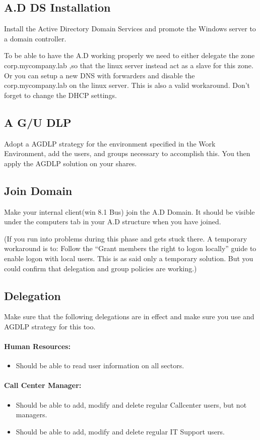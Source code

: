 \documentclass[paper=a4, fontsize=11pt]{report} %
\begin{document}
\subsection{A.D DS Installation}
Install the Active Directory Domain Services and promote the Windows server to a domain controller.

To be able to have the A.D working properly we need to either delegate the zone corp.mycompany.lab ,so that the linux server instead act as a slave for this zone. Or you can setup a new DNS with forwarders and disable the corp.mycompany.lab on the linux server. This is also a valid workaround. Don't forget to change the DHCP settings.

\subsection{A G/U DLP}
Adopt a AGDLP strategy for the environment specified in the Work Environment, add the users, and groups necessary to accomplish this. You then apply the AGDLP solution on your shares.

\subsection{Join Domain}
Make your internal client(win 8.1 Bus) join the A.D Domain. It should be visible under the computers tab in your A.D structure when you have joined.

(If you run into problems during this phase and gets stuck there. A temporary workaround is to: Follow the “Grant members the right to logon locally” guide to enable logon with local users. This is as said only a temporary solution. But you could confirm that delegation and group policies are working.)

\subsection{Delegation}
Make sure that the following delegations are in effect and make sure you use and AGDLP strategy for this too.
\paragraph{Human Resources:}
\begin{itemize}
	\item Should be able to read user information on all sectors.
\end{itemize}

\paragraph{Call Center Manager:}
\begin{itemize}
	\item Should be able to add, modify and delete regular Callcenter users, but not managers.
	\item Should be able to add, modify and delete regular IT Support users.
\end{itemize}
\end{document}
